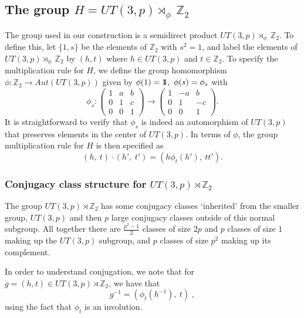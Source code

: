 \documentclass[12pt]{article}
\theoremstyle{definition}
\def\identity{{\rlap{1} \hskip 1.6pt \hbox{1}}}
\begin{document}
\subsection{The group $H = UT(3,p) \rtimes_{\phi}~\mathbb{Z}_2$}

The group used in our construction is a semidirect product $UT(3,p) \rtimes_{\phi}~\mathbb{Z}_2$. To define this, let $\{1,s\}$ be the elements of $\mathbb{Z}_2$ with $s^2 = 1$, and label the elements of $UT(3,p) \rtimes_{\phi}~\mathbb{Z}_2$ by $(h,t)$ where $h \in UT(3,p)$ and $t \in \mathbb{Z}_2$. To specify the multiplication rule for $H$, we define
the group homomorphism $\phi: \mathbb{Z}_2 \rightarrow Aut(UT(3,p))$ given by $\phi(1) = \identity,~\phi(s) = \phi_{s}$ with
\begin{equation}
\phi_{s} :
\begin{pmatrix}
1 & a & b \\
0 & 1 & c \\
0 & 0 & 1
\end{pmatrix}
\rightarrow
\begin{pmatrix}
1 & -a & b \\
0 & 1 & -c \\
0 & 0 & 1
\end{pmatrix}.
\end{equation}
It is straightforward to verify that $\phi_s$ is indeed an automorphism of $UT(3,p)$ that preserves elements in the center of $UT(3,p)$. In terms of $\phi$, the group multiplication rule for $H$ is then specified as
\begin{equation}
(h,~t) \cdot (h',~t') = (h \phi_t (h'),~tt').
\end{equation}

\subsubsection*{Conjugacy class structure for $UT(3,p) \rtimes \mathbb{Z}_2$}

The group $UT(3,p) \rtimes \mathbb{Z}_2$ has some conjugacy classes `inherited' from the smaller group, $UT(3,p)$ and then $p$ large conjugacy classes outside of this normal subgroup. All together there are $\frac{p^2-1}{2}$ classes of size $2p$ and $p$ classes of size $1$ making up the $UT(3,p)$ subgroup, and $p$ classes of size $p^2$ making up its complement.

\vspace{2mm}
In order to understand conjugation, we note that for $g = (h,t) \in UT(3,p) \rtimes \mathbb{Z}_2$, we have that
\begin{equation}
g^{-1}  = (\phi_t (h^{-1}),~t) \; ,
\end{equation}
using the fact that $\phi_t$ is an involution.
\end{document}
